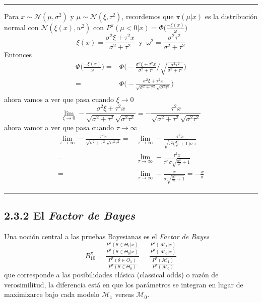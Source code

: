 \documentclass[12pt,]{article}
\begin{document}
\begin{center}\rule{0.5\linewidth}{\linethickness}\end{center}

Para \(x\sim\mathcal{N}(\mu,\sigma^2)\) y
\(\mu\sim\mathcal{N}(\xi,\tau^2)\), recordemos que \(\pi(\mu|x)\) es la
distribución normal con \(\mathcal{N}(\xi(x),w^2)\) con
\(P^\pi(\mu<0|x)=\Phi\bigg(\frac{-\xi(x)}{\omega}\bigg)\) \[
\xi(x)=\frac{\sigma^2\xi+\tau^2x}{\sigma^2+\tau^2}\ \text{ y }\ \omega^2=\frac{\sigma^2\tau^2}{\sigma^2+\tau^2}
\] Entonces \[
\begin{array}{rl}
\Phi\bigg(\frac{-\xi(x)}{\omega}\bigg)=&\Phi\Bigg(-\displaystyle \frac{\displaystyle \sigma^2\xi+\tau^2x}{\sigma^2+\tau^2}\Bigg/{\displaystyle\sqrt{\frac{\sigma^2\tau^2}{\sigma^2+\tau^2}}}\Bigg)\\
=&\Phi\Bigg(-\displaystyle \frac{\displaystyle \sigma^2\xi+\tau^2x}{\sqrt{\sigma^2+\tau^2} \sqrt{\sigma^2\tau^2}}\Bigg)\\
\end{array}
\] ahora vamos a ver que pasa cuando \(\xi\to 0\) \[
\lim_{\xi\to 0}-\displaystyle \frac{\displaystyle \sigma^2\xi+\tau^2x}{\sqrt{\sigma^2+\tau^2} \sqrt{\sigma^2\tau^2}}=-\displaystyle \frac{\displaystyle \tau^2x}{\sqrt{\sigma^2+\tau^2} \sqrt{\sigma^2\tau^2}}
\] ahora vamor a ver que pasa cuando \(\tau\to\infty\) \[
\begin{array}{rl}
\displaystyle \lim_{\tau\to\infty} -\displaystyle \frac{\displaystyle \tau^2x}{\sqrt{\sigma^2+\tau^2} \sqrt{\sigma^2\tau^2}}=& \displaystyle \lim_{\tau\to\infty}-\frac{\displaystyle \tau^2x}{\sqrt{\tau^2(\frac{\sigma^2}{\tau^2}+1}) \sigma\ \tau} \\
=&\displaystyle \lim_{\tau\to\infty}-\frac{\displaystyle \tau^2x}{\tau^2\ \sigma \sqrt{\frac{\sigma^2}{\tau^2}+1}}\\
=&\displaystyle \lim_{\tau\to\infty}-\frac{\displaystyle x}{\sigma \sqrt{\frac{\sigma^2}{\tau^2}+1}}=-\frac{x}{\sigma}
\end{array}
\]

\begin{center}\rule{0.5\linewidth}{\linethickness}\end{center}

\subsection{\texorpdfstring{2.3.2 El \emph{Factor de
Bayes}}{2.3.2 El Factor de Bayes}}\label{el-factor-de-bayes}

Una noción central a las pruebas Bayesianas es el \emph{Factor de Bayes}
\[
B_{10}^\pi=\displaystyle \frac{\frac{P^\pi(\theta\in\Theta_1|x)}{P^\pi(\theta\in\Theta_0|x)}}{\frac{P^\pi(\theta\in\Theta_1)}{P^\pi(\theta\in\Theta_0)}}=\displaystyle \frac{\frac{P^\pi(\mathcal{M}_1|x)}{P^\pi(\mathcal{M}_0|x)}}{\frac{P^\pi(\mathcal{M}_1)}{P^\pi(\mathcal{M}_0)}}
\] que corresponde a las posibilidades clásica (classical odds) o razón
de verosimilitud, la diferencia está en que los parámetros se integran
en lugar de maximizarce bajo cada modelo \(\mathcal{M}_1\) versus
\(\mathcal{M}_0\).
\end{document}
